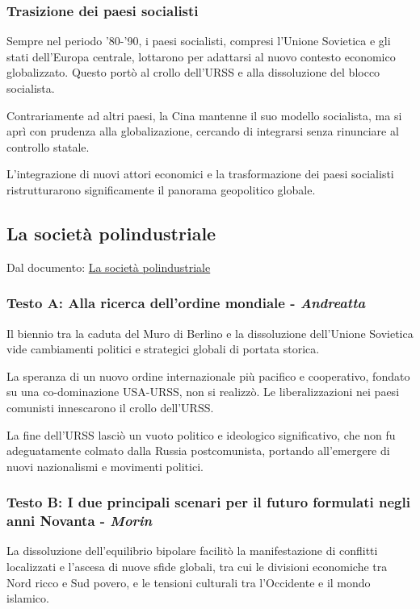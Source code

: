 \documentclass{article}
\begin{document}
\subsubsection{Trasizione dei paesi socialisti}
Sempre nel periodo '80-'90, i paesi socialisti, compresi l'Unione Sovietica e gli stati
dell'Europa centrale, lottarono per adattarsi al nuovo contesto economico globalizzato.
Questo portò al crollo dell'URSS e alla dissoluzione del blocco socialista.

Contrariamente ad altri paesi, la Cina mantenne il suo modello socialista, ma si aprì con
prudenza alla globalizazione, cercando di integrarsi senza rinunciare al controllo statale.

L'integrazione di nuovi attori economici e la trasformazione dei paesi socialisti
ristrutturarono significamente il panorama geopolitico globale.

\subsection{La società polindustriale}
Dal documento: \href{https://github.com/matteofrongillo/passerella/blob/main/Geografia/media/Pass_03b_Sabbatucci_Adreatta_Morin_Aime.pdf?raw=true}{La società polindustriale}

\subsubsection{Testo A: Alla ricerca dell'ordine mondiale - \textit{Andreatta}}
Il biennio tra la caduta del Muro di Berlino e la dissoluzione dell'Unione Sovietica vide
cambiamenti politici e strategici globali di portata storica.

La speranza di un nuovo ordine internazionale più pacifico e cooperativo, fondato su una
co-dominazione USA-URSS, non si realizzò. Le liberalizzazioni nei paesi comunisti innescarono
il crollo dell'URSS.

La fine dell'URSS lasciò un vuoto politico e ideologico significativo, che non fu adeguatamente
colmato dalla Russia postcomunista, portando all'emergere di nuovi nazionalismi e movimenti
politici.

\subsubsection{Testo B: I due principali scenari per il futuro formulati negli anni Novanta - \textit{Morin}}
La dissoluzione dell'equilibrio bipolare facilitò la manifestazione di conflitti localizzati e
l'ascesa di nuove sfide globali, tra cui le divisioni economiche tra Nord ricco e Sud povero, e
le tensioni culturali tra l'Occidente e il mondo islamico.
\end{document}
